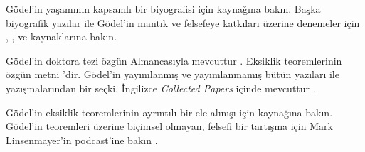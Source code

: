 \documentclass[../../../include/open-logic-section]{subfiles}
\begin{document}
\begin{reading}
G{\"o}del'in yaşamının kapsamlı bir biyografisi için \citet{Dawson1997}
kaynağına bakın. Başka biyografik yazılar ile G{\"o}del'in mantık ve felsefeye
katkıları üzerine denemeler için \citet{Wang1990}, \citet{Baaz2011},
\citet{Takeuti2003} ve \citet{Sigmund2007} kaynaklarına bakın.

G{\"o}del'in doktora tezi özgün Almancasıyla mevcuttur \citep{Godel1929}.
Eksiklik teoremlerinin özgün metni \citep{Godel1931}'dir. G\"odel'in
yayımlanmış ve yayımlanmamış bütün yazıları ile yazışmalarından bir seçki,
İngilizce \emph{Collected Papers} içinde mevcuttur
\citet{Godel1986,Godel1990}.

G{\"o}del'in eksiklik teoremlerinin ayrıntılı bir ele alınışı için
\citet{Smith2013} kaynağına bakın. G{\"o}del'in teoremleri üzerine biçimsel
olmayan, felsefi bir tartışma için Mark Linsenmayer'in podcast'ine bakın
\citep{Linsenmayer2014}.
\end{reading}
\end{document}
